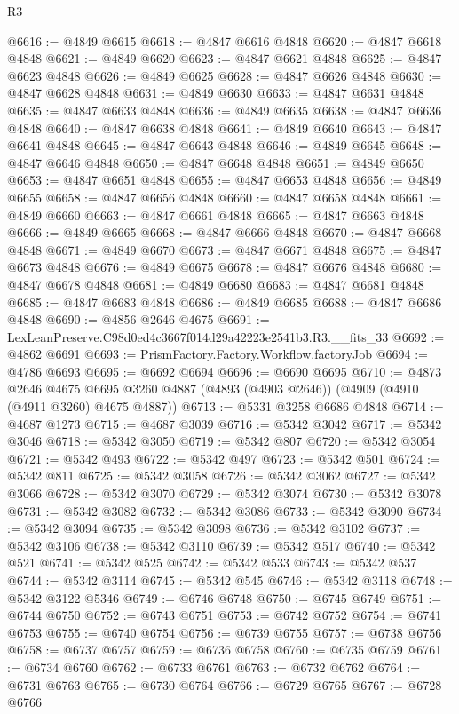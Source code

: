 \begin{lexlean}{R3}
\begin{coremodule}
@6616 := @4849 @6615
@6618 := @4847 @6616 @4848
@6620 := @4847 @6618 @4848
@6621 := @4849 @6620
@6623 := @4847 @6621 @4848
@6625 := @4847 @6623 @4848
@6626 := @4849 @6625
@6628 := @4847 @6626 @4848
@6630 := @4847 @6628 @4848
@6631 := @4849 @6630
@6633 := @4847 @6631 @4848
@6635 := @4847 @6633 @4848
@6636 := @4849 @6635
@6638 := @4847 @6636 @4848
@6640 := @4847 @6638 @4848
@6641 := @4849 @6640
@6643 := @4847 @6641 @4848
@6645 := @4847 @6643 @4848
@6646 := @4849 @6645
@6648 := @4847 @6646 @4848
@6650 := @4847 @6648 @4848
@6651 := @4849 @6650
@6653 := @4847 @6651 @4848
@6655 := @4847 @6653 @4848
@6656 := @4849 @6655
@6658 := @4847 @6656 @4848
@6660 := @4847 @6658 @4848
@6661 := @4849 @6660
@6663 := @4847 @6661 @4848
@6665 := @4847 @6663 @4848
@6666 := @4849 @6665
@6668 := @4847 @6666 @4848
@6670 := @4847 @6668 @4848
@6671 := @4849 @6670
@6673 := @4847 @6671 @4848
@6675 := @4847 @6673 @4848
@6676 := @4849 @6675
@6678 := @4847 @6676 @4848
@6680 := @4847 @6678 @4848
@6681 := @4849 @6680
@6683 := @4847 @6681 @4848
@6685 := @4847 @6683 @4848
@6686 := @4849 @6685
@6688 := @4847 @6686 @4848
@6690 := @4856 @2646 @4675
@6691 := LexLeanPreserve.C98d0ed4c3667f014d29a42223e2541b3.R3.__fits_33
@6692 := @4862 @6691
@6693 := PrismFactory.Factory.Workflow.factoryJob
@6694 := @4786 @6693
@6695 := @6692 @6694
@6696 := @6690 @6695
@6710 := @4873
    @2646
    @4675
    @6695
    @3260
    @4887
    (@4893 (@4903 @2646))
    (@4909 (@4910 (@4911 @3260) @4675 @4887))
@6713 := @5331 @3258 @6686 @4848
@6714 := @4687 @1273
@6715 := @4687 @3039
@6716 := @5342 @3042
@6717 := @5342 @3046
@6718 := @5342 @3050
@6719 := @5342 @807
@6720 := @5342 @3054
@6721 := @5342 @493
@6722 := @5342 @497
@6723 := @5342 @501
@6724 := @5342 @811
@6725 := @5342 @3058
@6726 := @5342 @3062
@6727 := @5342 @3066
@6728 := @5342 @3070
@6729 := @5342 @3074
@6730 := @5342 @3078
@6731 := @5342 @3082
@6732 := @5342 @3086
@6733 := @5342 @3090
@6734 := @5342 @3094
@6735 := @5342 @3098
@6736 := @5342 @3102
@6737 := @5342 @3106
@6738 := @5342 @3110
@6739 := @5342 @517
@6740 := @5342 @521
@6741 := @5342 @525
@6742 := @5342 @533
@6743 := @5342 @537
@6744 := @5342 @3114
@6745 := @5342 @545
@6746 := @5342 @3118
@6748 := @5342 @3122 @5346
@6749 := @6746 @6748
@6750 := @6745 @6749
@6751 := @6744 @6750
@6752 := @6743 @6751
@6753 := @6742 @6752
@6754 := @6741 @6753
@6755 := @6740 @6754
@6756 := @6739 @6755
@6757 := @6738 @6756
@6758 := @6737 @6757
@6759 := @6736 @6758
@6760 := @6735 @6759
@6761 := @6734 @6760
@6762 := @6733 @6761
@6763 := @6732 @6762
@6764 := @6731 @6763
@6765 := @6730 @6764
@6766 := @6729 @6765
@6767 := @6728 @6766

\end{coremodule}
\end{lexlean}
